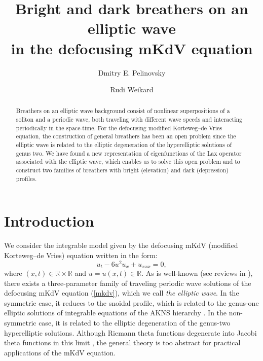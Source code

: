 \documentclass[12pt,reqno]{amsart}
\numberwithin{equation}{section}
\newcommand{\R}{\mathbb{R}}
\begin{document}
	
\title[Bright and dark breathers in the defocusing mKdV equation]{\bf Bright and dark breathers on an elliptic wave \\in the defocusing mKdV equation}

	
\author{Dmitry E. Pelinovsky}
\address[D. E. Pelinovsky]{Department of Mathematics and Statistics, McMaster University, Hamilton, Ontario, Canada, L8S 4K1}

\author{Rudi Weikard}
\address[R. Weikard]{Department of Mathematics, University of Alabama at Birmingham, Birmingham, AL 35294--1241 USA}

\maketitle


\begin{abstract}
	Breathers on an elliptic wave background consist of nonlinear superpositions of a soliton and a periodic wave, both traveling with different wave speeds and interacting periodically in the space-time. For the defocusing modified Korteweg--de Vries equation, the construction of general breathers has been an open problem since the elliptic wave is related to the elliptic degeneration of the hyperelliptic solutions of genus two. We have found a new representation of eigenfunctions of the Lax operator associated with the elliptic wave, which enables us to solve this open problem and to construct two families of breathers with bright (elevation) and dark (depression) profiles. 
\end{abstract}
	

\section{Introduction}

We consider the integrable model given by the defocusing mKdV (modified Korteweg--de Vries) equation written in the form:
\begin{equation}
\label{mkdv}
u_t-6u^2u_x+u_{xxx}=0,
\end{equation}
where $(x,t)\in \mathbb{R}\times\mathbb{R}$ and $u=u(x,t) \in \R$. As is well-known (see reviews in \cite{El,Hoefer}), there exists a three-parameter family of traveling periodic wave solutions of the defocusing mKdV equation (\ref{mkdv}), which we call {\em the elliptic wave}. In the symmetric case, it 
reduces to the snoidal profile, which is related 
to the genus-one elliptic solutions of integrable equations of the AKNS hierarchy \cite{B}. In the non-symmetric case, it is related to the elliptic degeneration of the genus-two hyperelliptic solutions. Although 
Riemann theta functions degenerate into Jacobi theta functions in this limit \cite{FayBook}, the general theory is too abstract for practical applications 
of the mKdV equation. 
\end{document}
